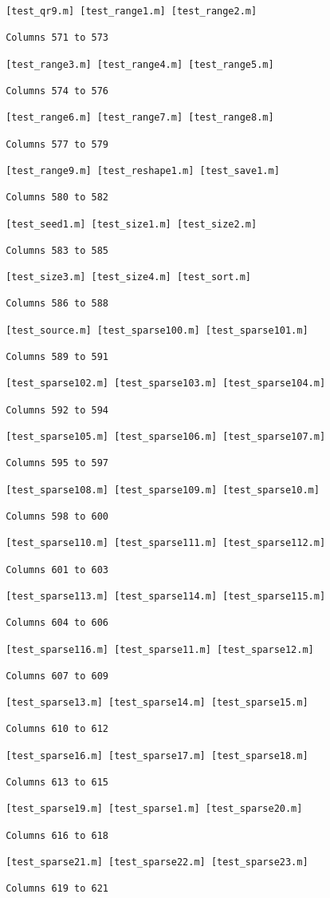 \begin{verbatim}
 [test_qr9.m] [test_range1.m] [test_range2.m] 

 Columns 571 to 573

 [test_range3.m] [test_range4.m] [test_range5.m] 

 Columns 574 to 576

 [test_range6.m] [test_range7.m] [test_range8.m] 

 Columns 577 to 579

 [test_range9.m] [test_reshape1.m] [test_save1.m] 

 Columns 580 to 582

 [test_seed1.m] [test_size1.m] [test_size2.m] 

 Columns 583 to 585

 [test_size3.m] [test_size4.m] [test_sort.m] 

 Columns 586 to 588

 [test_source.m] [test_sparse100.m] [test_sparse101.m] 

 Columns 589 to 591

 [test_sparse102.m] [test_sparse103.m] [test_sparse104.m] 

 Columns 592 to 594

 [test_sparse105.m] [test_sparse106.m] [test_sparse107.m] 

 Columns 595 to 597

 [test_sparse108.m] [test_sparse109.m] [test_sparse10.m] 

 Columns 598 to 600

 [test_sparse110.m] [test_sparse111.m] [test_sparse112.m] 

 Columns 601 to 603

 [test_sparse113.m] [test_sparse114.m] [test_sparse115.m] 

 Columns 604 to 606

 [test_sparse116.m] [test_sparse11.m] [test_sparse12.m] 

 Columns 607 to 609

 [test_sparse13.m] [test_sparse14.m] [test_sparse15.m] 

 Columns 610 to 612

 [test_sparse16.m] [test_sparse17.m] [test_sparse18.m] 

 Columns 613 to 615

 [test_sparse19.m] [test_sparse1.m] [test_sparse20.m] 

 Columns 616 to 618

 [test_sparse21.m] [test_sparse22.m] [test_sparse23.m] 

 Columns 619 to 621


\end{verbatim}
